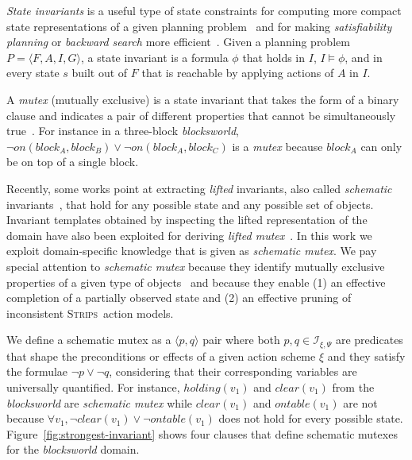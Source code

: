 \documentclass{article}
\newcommand{\tup}[1]{{\langle #1 \rangle}}
\newcommand{\strips}{\textsc{Strips}}
\begin{document}
{\em State invariants} is a useful type of state constraints for computing more compact state representations of a given planning problem~\cite{helmert2009concise} and for making {\em satisfiability planning} or {\em backward search} more efficient~\cite{rintanen2014madagascar,alcazar2015reminder}. Given a planning problem $P=\tup{F,A,I,G}$, a state invariant is a formula $\phi$ that holds in $I$, $I\models \phi$, and in every state $s$ built out of $F$ that is reachable by applying actions of $A$ in $I$.

A {\em mutex} (mutually exclusive) is a state invariant that takes the form of a binary clause and indicates a pair of different properties that cannot be simultaneously true~\cite{kautz:mutex:IJCAI1999}. For instance in a three-block {\em blocksworld}, $\neg on(block_A,block_B)\vee \neg on(block_A,block_C)$ is a {\em mutex} because $block_A$ can only be on top of a single block.

Recently, some works point at extracting \emph{lifted} invariants, also called {\em schematic} invariants~\cite{rintanen:schematicInvariants:AAAI2017}, that hold for any possible state and any possible set of objects. Invariant
templates obtained by inspecting the lifted representation of the domain have also been exploited for deriving \emph{lifted mutex}~\cite{BernardiniFS18}. In this work we exploit domain-specific knowledge that is given as {\em schematic mutex}. We pay special attention to {\em schematic mutex} because they identify mutually exclusive properties of a given type of objects~\cite{fox:TIM:JAIR1998} and because they enable (1) an effective completion of a partially observed state and (2) an effective pruning of inconsistent \strips\ action models.


We define a schematic mutex as a $\tup{p,q}$ pair where both $p,q\in{\mathcal I}_{\xi,\Psi}$ are predicates that shape the preconditions or effects of a given action scheme $\xi$ and they satisfy the formulae $\neg p\vee \neg q$, considering that their corresponding variables are universally quantified. For instance, $holding(v_1)$ and $clear(v_1)$ from the {\em blocksworld} are {\em schematic mutex} while $clear(v_1)$ and $ontable(v_1)$ are not because $\forall v_1, \neg clear(v_1)\vee\neg ontable(v_1)$ does not hold for every possible state. Figure~\ref{fig:strongest-invariant} shows four clauses that define schematic mutexes for the {\em blocksworld} domain.
\end{document}
